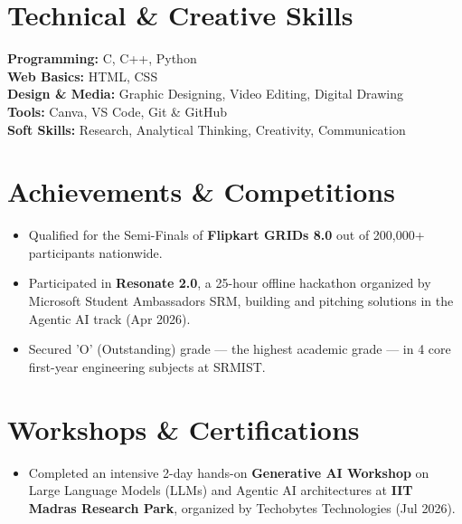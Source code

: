 \documentclass[letterpaper,10pt]{article}
\newcommand{\resumeItem}[1]{
  \item\small{
    {#1 \vspace{-2pt}}
  }
}
\newcommand{\resumeSubHeadingListStart}{\begin{itemize}[leftmargin=0.0in, label={}]}
\newcommand{\resumeSubHeadingListEnd}{\end{itemize}}
\newcommand{\resumeItemListStart}{\begin{itemize}[leftmargin=0.15in, label=\raisebox{0.15ex}{\tiny$\bullet$}, itemsep=1.5pt]}
\newcommand{\resumeItemListEnd}{\end{itemize}\vspace{-3pt}}
\begin{document}
\section{Technical \& Creative Skills}
 \begin{itemize}[leftmargin=0.0in, label={}, itemsep=2pt]
    \small{\item{
     \textbf{Programming:}{ C, C++, Python} \\
     \textbf{Web Basics:}{ HTML, CSS} \\
     \textbf{Design \& Media:}{ Graphic Designing, Video Editing, Digital Drawing} \\
     \textbf{Tools:}{ Canva, VS Code, Git \& GitHub} \\
     \textbf{Soft Skills:}{ Research, Analytical Thinking, Creativity, Communication}
    }}
 \end{itemize}

\section{Achievements \& Competitions}
    \resumeSubHeadingListStart
        \resumeItemListStart
            \resumeItem{Qualified for the Semi-Finals of \textbf{Flipkart GRIDs 8.0} out of 200,000+ participants nationwide.}
            \resumeItem{Participated in \textbf{Resonate 2.0}, a 25-hour offline hackathon organized by Microsoft Student Ambassadors SRM, building and pitching solutions in the Agentic AI track (Apr 2026).}
            \resumeItem{Secured 'O' (Outstanding) grade --- the highest academic grade --- in 4 core first-year engineering subjects at SRMIST.}
        \resumeItemListEnd
    \resumeSubHeadingListEnd

\section{Workshops \& Certifications}
    \resumeSubHeadingListStart
        \resumeItemListStart
            \resumeItem{Completed an intensive 2-day hands-on \textbf{Generative AI Workshop} on Large Language Models (LLMs) and Agentic AI architectures at \textbf{IIT Madras Research Park}, organized by Techobytes Technologies (Jul 2026).}
        \resumeItemListEnd
    \resumeSubHeadingListEnd

\end{document}
